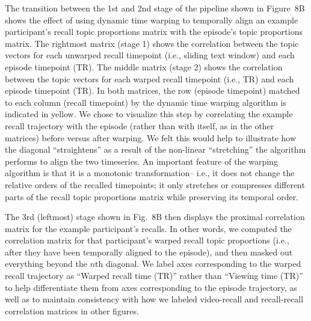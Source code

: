 \documentclass{article}
\newcommand{\brains}{8}
\begin{document}
The transition between the 1st and 2nd stage of the pipeline shown in Figure~\brains B shows the effect of using dynamic time warping to temporally align an example participant’s recall topic proportions matrix with the episode’s topic proportions matrix.  The rightmost matrix (stage 1) shows the correlation between the topic vectors for each unwarped recall timepoint (i.e., sliding text window) and each episode timepoint (TR).  The middle matrix (stage 2) shows the correlation between the topic vectors for each warped recall timepoint (i.e., TR) and each episode timepoint (TR).  In both matrices, the row (episode timepoint) matched to each column (recall timepoint) by the dynamic time warping algorithm is indicated in yellow.  We chose to visualize this step by correlating the example recall trajectory with the episode (rather than with itself, as in the other matrices) before versus after warping.  We felt this would help to illustrate how the diagonal ``straightens'' as a result of the non-linear ``stretching'' the algorithm performs to align the two timeseries.  An important feature of the warping algorithm is that it is a monotonic transformation-- i.e., it does not change the relative orders of the recalled timepoints; it only stretches or compresses different parts of the recall topic proportions matrix while preserving its temporal order.

The 3rd (leftmost) stage shown in Fig.~\brains B then displays the proximal correlation matrix for the example participant’s recalls.  In other words, we computed the correlation matrix for that participant’s warped recall topic proportions (i.e., after they have been temporally aligned to the episode), and then masked out everything beyond the $n$th diagonal.  We label axes corresponding to the warped recall trajectory as “Warped recall time (TR)” rather than “Viewing time (TR)” to help differentiate them from axes corresponding to the episode trajectory, as well as to maintain consistency with how we labeled video-recall and recall-recall correlation matrices in other figures.
\end{document}
